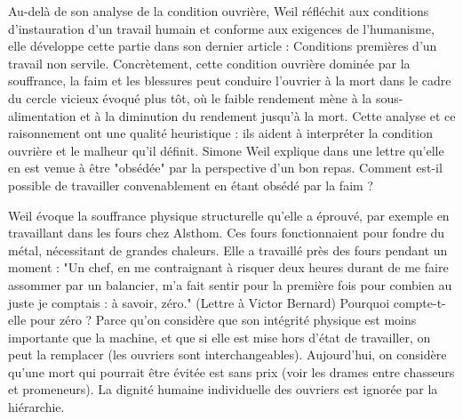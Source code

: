 \documentclass[a4paper,12pt]{book}
\begin{document}
\par Au-delà de son analyse de la condition ouvrière, Weil réfléchit aux conditions d'instauration d'un travail humain et conforme aux exigences de l'humanisme, elle développe cette partie dans son dernier article : Conditions premières d'un travail non servile. Concrètement, cette condition ouvrière dominée par la souffrance, la faim et les blessures peut conduire l'ouvrier à la mort dans le cadre du cercle vicieux évoqué plus tôt, où le faible rendement mène à la sous-alimentation et à la diminution du rendement jusqu'à la mort. Cette analyse et ce raisonnement ont une qualité heuristique : ils aident à interpréter la condition ouvrière et le malheur qu'il définit. Simone Weil explique dans une lettre qu'elle en est venue à être "obsédée" par la perspective d'un bon repas. Comment est-il possible de travailler convenablement en étant obsédé par la faim ?
\par Weil évoque la souffrance physique structurelle qu'elle a éprouvé, par exemple en travaillant dans les fours chez Alsthom. Ces fours fonctionnaient pour fondre du métal, nécessitant de grandes chaleurs. Elle a travaillé près des fours pendant un moment : "Un chef, en me contraignant à risquer deux heures durant de me faire assommer par un balancier, m'a fait sentir pour la première fois pour combien au juste je comptais : à savoir, zéro." (Lettre à Victor Bernard) Pourquoi compte-t-elle pour zéro ? Parce qu'on considère que son intégrité physique est moins importante que la machine, et que si elle est mise hors d'état de travailler, on peut la remplacer (les ouvriers sont interchangeables). Aujourd'hui, on considère qu'une mort qui pourrait être évitée est sans prix (voir les drames entre chasseurs et promeneurs). La dignité humaine individuelle des ouvriers est ignorée par la hiérarchie.
\end{document}

